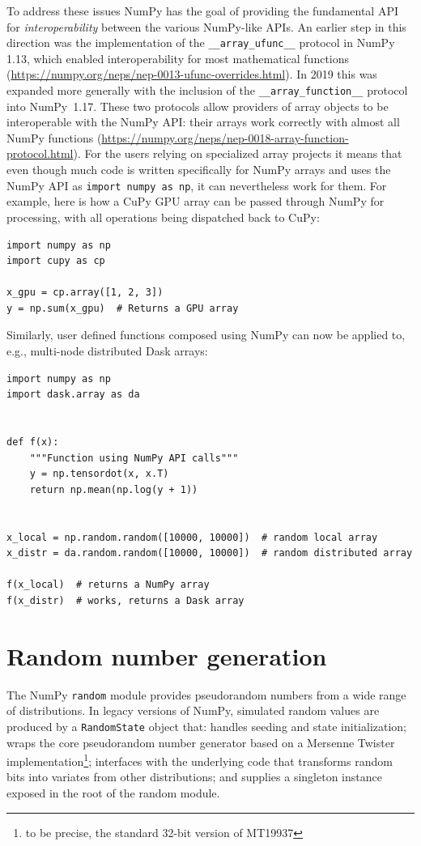 To address these issues NumPy has the goal of providing the fundamental
API for \emph{interoperability} between the various NumPy-like APIs.
An earlier step in this direction was the implementation of the
\texttt{\_\_array\_ufunc\_\_} protocol in NumPy 1.13, which enabled interoperability
for most mathematical functions (\url{https://numpy.org/neps/nep-0013-ufunc-overrides.html}).
In 2019 this was expanded more generally with the inclusion of the
\texttt{\_\_array\_function\_\_} protocol into NumPy~1.17.
These two protocols allow providers of array objects to be interoperable
with the NumPy API: their arrays work correctly with almost all NumPy
functions (\url{https://numpy.org/neps/nep-0018-array-function-protocol.html}).
For the users relying on specialized array projects it means that even though
much code is written specifically for NumPy arrays and uses the NumPy API as
\texttt{import numpy as np}, it can nevertheless work for them.
For example, here is how a CuPy GPU array can be passed through NumPy for
processing, with all operations being dispatched back to CuPy:

\begin{lstlisting}
import numpy as np
import cupy as cp

x_gpu = cp.array([1, 2, 3])
y = np.sum(x_gpu)  # Returns a GPU array
\end{lstlisting}

Similarly, user defined functions composed using NumPy can now be
applied to, e.g., multi-node distributed Dask arrays:

\begin{lstlisting}
import numpy as np
import dask.array as da


def f(x):
    """Function using NumPy API calls"""
    y = np.tensordot(x, x.T)
    return np.mean(np.log(y + 1))


x_local = np.random.random([10000, 10000])  # random local array
x_distr = da.random.random([10000, 10000])  # random distributed array

f(x_local)  # returns a NumPy array
f(x_distr)  # works, returns a Dask array
\end{lstlisting}

\section*{Random number generation}

The NumPy \texttt{random} module provides pseudorandom numbers from a wide range of
distributions. In legacy versions of NumPy, simulated random values are produced
by a \texttt{RandomState} object that: handles seeding and state initialization;
wraps the core pseudorandom number generator based on a Mersenne Twister
implementation\footnote{to be precise, the standard 32-bit version of MT19937};
interfaces with the underlying code that transforms random bits into
variates from other distributions; and supplies a singleton instance exposed in
the root of the random module.

